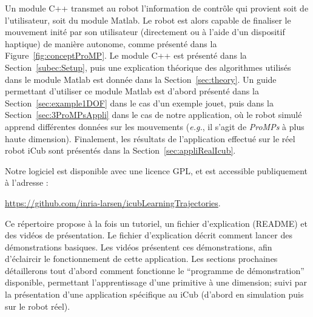 \documentclass[utf8]{frontiersSCNS} %
\newcommand{\todo}[1]{\textcolor{red}{\textbf{/*#1*/}}}
\begin{document}
Un module C++ transmet au robot l'information de contrôle qui provient soit de l'utilisateur, soit du module Matlab. Le robot est alors capable de finaliser le mouvement inité par son utilisateur (directement ou à l'aide d'un dispositif haptique) de manière autonome, comme présenté dans la Figure~\ref{fig:conceptProMP}. %
Le module C++ est présenté dans la Section~\ref{subec:Setup}, puis une explication théorique des algorithmes utilisés dans le module Matlab  est donnée dans la Section~\ref{sec:theory}. Un guide permettant d'utiliser ce module Matlab est d'abord présenté dans  la Section~\ref{sec:example1DOF} dans le cas d'un exemple jouet, puis dans la Section~\ref{sec:3ProMPsAppli} dans le cas de notre application, où le robot simulé apprend différentes données sur les mouvements (\textit{e.g.}, il s'agit de \textit{ProMPs} à plus haute dimension). Finalement, les résultats de l'application effectué sur le réel robot iCub sont présentés dans la Section~\ref{sec:appliRealIcub}.

Notre logiciel est disponible avec une licence GPL, et est accessible publiquement à l'adresse : 

\url{https://github.com/inria-larsen/icubLearningTrajectories}.

Ce répertoire propose à la fois un tutoriel, un fichier d'explication (README) et des vidéos de présentation.
Le fichier d'explication décrit comment lancer des démonstrations basiques. Les vidéos présentent ces démonstrations, afin d'éclaircir le fonctionnement de cette application. Les sections prochaines détaillerons tout d'abord comment fonctionne le ``programme de démonstration'' disponible, permettant l'apprentissage d'une primitive à une dimension; suivi par la présentation d'une application spécifique au iCub (d'abord en simulation puis sur le robot réel).


\end{document}
